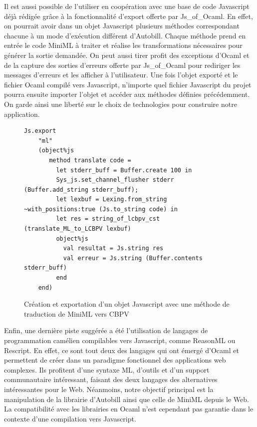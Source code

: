 \documentclass[12pt]{article}
\begin{document}
Il est aussi possible de l'utiliser en coopération avec une base de code Javascript déjà rédigée grâce à la fonctionnalité d'export offerte par Js\_of\_Ocaml. En effet, on pourrait avoir dans un objet Javascript plusieurs méthodes correspondant chacune à un mode d'exécution différent d'Autobill. Chaque méthode prend en entrée le code MiniML à traiter et réalise les transformations nécessaires pour générer la sortie demandée. On peut aussi tirer profit des exceptions d'Ocaml et de la capture des sorties d'erreurs offerte par Js\_of\_Ocaml pour rediriger les messages d'erreurs et les afficher à l'utilisateur. Une fois l'objet exporté et le fichier Ocaml compilé vers Javascript, n'importe quel fichier Javascript du projet pourra ensuite importer l'objet et accéder aux méthodes définies précédemment. On garde ainsi une liberté sur le choix de technologies pour construire notre application.\\

\begin{figure}[!b]
      \begin{lstlisting}[language=caml]
Js.export
    "ml"
    (object%js
       method translate code =
         let stderr_buff = Buffer.create 100 in
         Sys_js.set_channel_flusher stderr (Buffer.add_string stderr_buff);
         let lexbuf = Lexing.from_string ~with_positions:true (Js.to_string code) in
         let res = string_of_lcbpv_cst (translate_ML_to_LCBPV lexbuf)
         object%js
           val resultat = Js.string res
           val erreur = Js.string (Buffer.contents stderr_buff)
         end
    end)
\end{lstlisting}
      \caption{Création et exportation d'un objet Javascript avec une méthode de traduction de MiniML vers CBPV}
\end{figure}
Enfin, une dernière piste suggérée a été l'utilisation de langages de programmation camélien compilables vers Javascript, comme ReasonML ou Rescript. En effet, ce sont tout deux des langages qui ont émergé d'Ocaml et permettent de créer dans un paradigme fonctionnel des applications web complexes. Ils profitent d'une syntaxe ML, d'outils et d'un support communautaire intéressant, faisant des deux langages des alternatives intéressantes pour le Web. Néanmoins, notre objectif principal est la manipulation de la librairie d'Autobill ainsi que celle de MiniML depuis le Web. La compatibilité avec les librairies en Ocaml n'est cependant pas garantie dans le contexte d'une compilation vers Javascript. \\
\end{document}
